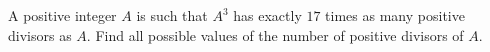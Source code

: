 A positive integer $A$ is such that $A^3$ has exactly $17$ times as many positive divisors as $A$. Find all possible values of the number of positive divisors of $A$.
